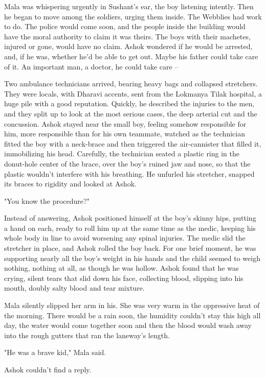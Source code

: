Mala was whispering urgently in Sushant's ear, the boy listening
intently. Then he began to move among the soldiers, urging them
inside. The Webblies had work to do. The police would come soon,
and the people inside the building would have the moral authority
to claim it was theirs. The boys with their machetes, injured or
gone, would have no claim. Ashok wondered if he would be arrested,
and, if he was, whether he'd be able to get out. Maybe his father
could take care of it. An important man, a doctor, he could take
care --

Two ambulance technicians arrived, bearing heavy bags and collapsed
stretchers. They were locals, with Dharavi accents, sent from the
Lokmanya Tilak hospital, a huge pile with a good reputation.
Quickly, he described the injuries to the men, and they split up to
look at the most serious cases, the deep arterial cut and the
concussion. Ashok stayed near the small boy, feeling somehow
responsible for him, more responsible than for his own teammate,
watched as the technician fitted the boy with a neck-brace and then
triggered the air-cannister that filled it, immobilizing his head.
Carefully, the technician seated a plastic ring in the donut-hole
center of the brace, over the boy's ruined jaw and nose, so that
the plastic wouldn't interfere with his breathing. He unfurled his
stretcher, snapped its braces to rigidity and looked at Ashok.

"You know the procedure?"

Instead of answering, Ashok positioned himself at the boy's skinny
hips, putting a hand on each, ready to roll him up at the same time
as the medic, keeping his whole body in line to avoid worsening any
spinal injuries. The medic slid the stretcher in place, and Ashok
rolled the boy back. For one brief moment, he was supporting nearly
all the boy's weight in his hands and the child seemed to weigh
nothing, nothing at all, as though he was hollow. Ashok found that
he was crying, silent tears that slid down his face, collecting
blood, slipping into his mouth, doubly salty blood and tear
mixture.

Mala silently slipped her arm in his. She was very warm in the
oppressive heat of the morning. There would be a rain soon, the
humidity couldn't stay this high all day, the water would come
together soon and then the blood would wash away into the rough
gutters that ran the laneway's length.

"He was a brave kid," Mala said.

Ashok couldn't find a reply.

